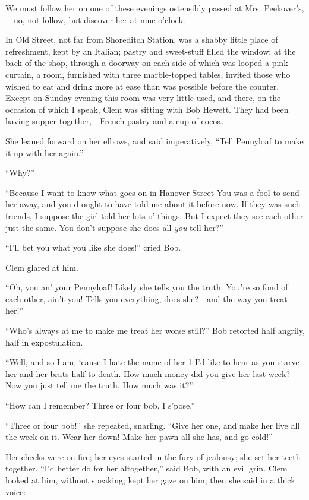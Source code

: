 We must follow her on one of these evenings ostensibly passed at Mrs.
Peekover's,---no, not follow, but discover her at nine o'clock.

In Old Street, not far from Shoreditch Station, was a shabby little
place of refreshment, kept by an Italian; pastry and sweet-stuff filled
the window; at the back of the shop, through a doorway on each side of
which was looped a pink curtain, a room, furnished with three
marble-topped tables, invited those who wished to eat and drink more at
ease than was possible before the counter. Except on Sunday evening this
room was very little used, and there, on the occasion of which I speak,
Clem was sitting with Bob Hewett. They had been having supper
together,---French pastry and a cup of cocoa.

She leaned forward on her elbows, and said {}imperatively, ``Tell
Pennyloaf to make it up with her again.''

``Why?''

``Because I want to know what goes on in Hanover Street You was a fool
to send her away, and you d ought to have told me about it before now.
If they was such friends, I suppose the girl told her lots o' things.
But I expect they see each other just the same. You don't suppose she
does all \emph{you} tell her?''

``I'll bet you what you like she does!'' cried Bob.

Clem glared at him.

``Oh, you an' your Pennyloaf! Likely she tells you the truth. You're so
fond of each other, ain't you! Tells you everything, does she?---and the
way you treat her!''

``Who's always at me to make me treat her worse still?'' Bob retorted
half angrily, half in expostulation.

``Well, and so I am, `cause I hate the name of her 1 I'd like to hear as
you starve her and her brats half to death. How much money did you give
her last week? Now you just tell me the truth. How much was it?''

{}``How can I remember? Three or four bob, I s'pose.''

``Three or four bob!'' she repeated, snarling. ``Give her one, and make
her live all the week on it. Wear her down! Make her pawn all she has,
and go cold!''

Her cheeks were on fire; her eyes started in the fury of jealousy; she
set her teeth together. ``I'd better do for her altogether,'' said Bob,
with an evil grin. Clem looked at him, without speaking; kept her gaze
on him; then she said in a thick voice:

